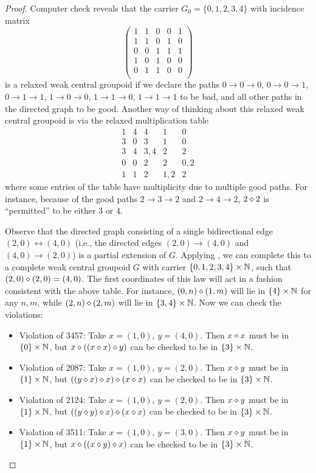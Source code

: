 \begin{proof}  Computer check reveals that the carrier $G_0=\{0,1,2,3 ,4\}$ with incidence matrix
$$
\begin{pmatrix}
  1 & 1 & 0 & 0 & 1 \\
  1 & 1 & 0 & 1 & 0 \\
  0 & 0 & 1 & 1 & 1 \\
  1 & 0 & 1 & 0 & 0 \\
  0 & 1 & 1 & 0 & 0 \\
  \end{pmatrix}
$$
is a relaxed weak central groupoid if we declare the paths $0 \to 0 \to 0$, $0 \to 0 \to 1$, $0 \to 1 \to 1$, $1 \to 0 \to 0$, $1 \to 1 \to 0$, $1 \to 1 \to 1$ to be bad, and all other paths in the directed graph to be good.  Another way of thinking about this relaxed weak central groupoid is via the relaxed multiplication table
$$
\begin{matrix}
1 & 4 & 4 & 1 & 0\\
3 & 0 & 3 & 1 & 0\\
3 & 4 & 3,4 & 2 & 2 \\
0 & 0 & 2 & 2 & 0,2 \\
1 & 1 & 2 & 1,2 & 2
\end{matrix}
$$
where some entries of the table have multiplicity due to multiple good paths.  For instance, because of the good paths $2 \to 3 \to 2$ and $2 \to 4 \to 2$, $2 \diamond 2$ is ``permitted'' to be either $3$ or $4$.

Observe that the directed graph consisting of a single bidirectional edge $(2,0) \leftrightarrow (4,0)$ (i.e., the directed edges $(2,0) \to (4,0)$ and $(4,0) \to (2,0)$) is a partial extension of $G$.  Applying , we can complete this to a complete weak central groupoid $G$ with carrier $\{0,1,2,3,4\} \times \mathbb{N}$, such that $(2,0) \diamond (2,0) = (4,0)$.  The first coordinates of this law will act in a fashion consistent with the above table.  For instance, $(0,n) \diamond (1,m)$ will lie in $\{4\} \times \mathbb{N}$ for any $n,m$, while $(2,n) \diamond (2,m)$ will lie in $\{3,4\} \times \mathbb{N}$.  Now we can check the violations:
\begin{itemize}
\item Violation of 3457:  Take $x = (1,0)$, $y = (4,0)$.  Then $x \diamond x$ must be in $\{0\} \times \mathbb{N}$, but $x \diamond ((x \diamond x) \diamond y)$ can be checked to be in $\{3\} \times \mathbb{N}$.
\item Violation of 2087:  Take $x = (1,0)$, $y = (2,0)$.  Then $x \diamond y$ must be in $\{1\} \times \mathbb{N}$, but $((y \diamond x) \diamond x) \diamond (x \diamond x)$ can be checked to be in $\{3\} \times \mathbb{N}$.
\item Violation of 2124:  Take $x = (1,0)$, $y = (2,0)$.  Then $x \diamond y$ must be in $\{1\} \times \mathbb{N}$, but $((y \diamond y) \diamond x) \diamond (x \diamond x)$ can be checked to be in $\{3\} \times \mathbb{N}$.
\item Violation of 3511:  Take $x = (1,0)$, $y = (3,0)$.  Then $x \diamond y$ must be in $\{1\} \times \mathbb{N}$, but $x \diamond ((x \diamond y) \diamond x)$ can be checked to be in $\{3\} \times \mathbb{N}$.
\end{itemize}
\end{proof}
